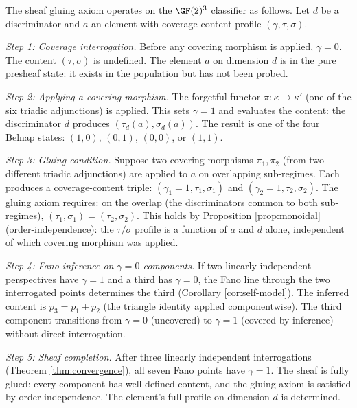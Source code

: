 \begin{proposition}
\label{prop:gluing-mechanics}
The sheaf gluing axiom operates on the $\GF(2)^3$
classifier as follows. Let $d$ be a discriminator and
$a$ an element with coverage-content profile
$(\gamma, \tau, \sigma)$.

\emph{Step 1: Coverage interrogation.}
Before any covering morphism is applied, $\gamma = 0$.
The content $(\tau, \sigma)$ is undefined. The element
$a$ on dimension $d$ is in the pure presheaf state:
it exists in the population but has not been probed.

\emph{Step 2: Applying a covering morphism.}
The forgetful functor $\pi: \kappa \to \kappa'$
(one of the six triadic adjunctions) is applied. This
sets $\gamma = 1$ and evaluates the content: the
discriminator $d$ produces $(\tau_d(a), \sigma_d(a))$.
The result is one of the four Belnap states:
$(1,0)$, $(0,1)$, $(0,0)$, or $(1,1)$.

\emph{Step 3: Gluing condition.}
Suppose two covering morphisms $\pi_1, \pi_2$ (from
two different triadic adjunctions) are applied to $a$
on overlapping sub-regimes. Each produces a
coverage-content triple:
$(\gamma_1 = 1, \tau_1, \sigma_1)$ and
$(\gamma_2 = 1, \tau_2, \sigma_2)$.
The gluing axiom requires: on the overlap (the
discriminators common to both sub-regimes),
$(\tau_1, \sigma_1) = (\tau_2, \sigma_2)$. This holds
by Proposition \ref{prop:monoidal} (order-independence):
the $\tau/\sigma$ profile is a function of $a$ and $d$
alone, independent of which covering morphism was applied.

\emph{Step 4: Fano inference on $\gamma = 0$ components.}
If two linearly independent perspectives have $\gamma = 1$
and a third has $\gamma = 0$, the Fano line through the
two interrogated points determines the third
(Corollary \ref{cor:self-model}). The inferred content is
$p_3 = p_1 + p_2$ (the triangle identity applied
componentwise). The third component transitions from
$\gamma = 0$ (uncovered) to $\gamma = 1$ (covered by
inference) without direct interrogation.

\emph{Step 5: Sheaf completion.}
After three linearly independent interrogations (Theorem
\ref{thm:convergence}), all seven Fano points have
$\gamma = 1$. The sheaf is fully glued: every component
has well-defined content, and the gluing axiom is
satisfied by order-independence. The element's full
profile on dimension $d$ is determined.
\end{proposition}


